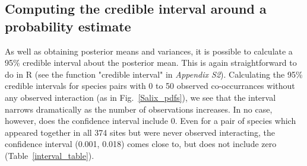\documentclass[12pt]{article}
\begin{document}
  \subsection*{Computing the credible interval around a probability estimate}

      As well as obtaining posterior means and variances, it is possible to calculate a 95\% credible interval about the posterior mean. This is again straightforward to do in R (see the function "credible interval" in \emph{Appendix S2}). Calculating the 95\% credible intervals for species pairs with 0 to 50 observed co-occurrances without any observed interaction (as in Fig.~\ref{Salix_pdfs}), we see that the interval narrows dramatically as the number of observations increases. In no case, however, does the confidence interval include 0. Even for a pair of species which appeared together in all 374 sites but were never observed interacting, the confidence interval (0.001, 0.018) comes close to, but does not include zero (Table~\ref{interval_table}). 

\end{document}
